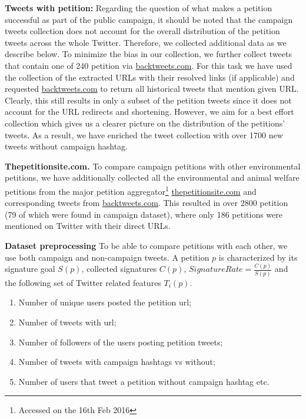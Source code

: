 \textbf{Tweets with petition:}
Regarding the question of what makes a petition successful as part of the public campaign,
it should be noted that the campaign tweets collection does not account for the overall distribution of the petition tweets across the whole Twitter. 
Therefore, we collected additional data as we describe below.
To minimize the bias in our collection, we further collect tweets that contain one of 240 petition via \url{backtweets.com}. For this task we have used the collection of the extracted URLs with their resolved links (if applicable) and requested \url{backtweets.com} to return all historical tweets that mention given URL.
Clearly, this still results in only a subset of the petition tweets since it does not account for the URL redirects and shortening. However, we aim for a best effort collection which gives us a clearer picture on the distribution of the petitions' tweets.
As a result, we have enriched the tweet collection with over 1700 new tweets without campaign hashtag.

\textbf{Thepetitionsite.com.} To compare campaign petitions with other environmental petitions, we have additionally collected all the environmental and animal welfare petitions from the major petition aggregator\footnote{Accessed on the 16th Feb 2016} \url{thepetitionsite.com} and corresponding tweets from \url{backtweets.com}. This resulted in over 2800 petition (79 of which were found in campaign dataset), where only 186 petitions were mentioned on Twitter with their direct URLs.

\textbf{Dataset preprocessing}
To be able to compare petitions with each other, we use both campaign and non-campaign tweets.
A petition $p$ is characterized by its signature goal $S(p)$, collected signatures $C(p)$, $SignatureRate = \frac{C(p)}{S(p)}$ and the following set of Twitter related features $T_i(p)$.
\begin{enumerate}
	\setlength\itemsep{0em}
	\item Number of unique users posted the petition url;
	\item Number of tweets with url;
	\item Number of followers of the users posting petition tweets;
	\item Number of tweets with campaign hashtags vs without;
	\item Number of users that tweet a petition without campaign hashtag etc.
\end{enumerate}